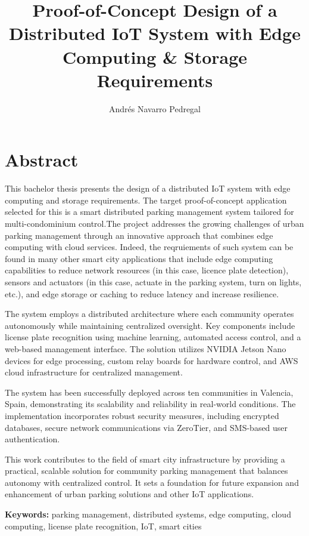 \documentclass[oneside, 12pt, a4paper]{book}
\title{Proof-of-Concept Design of a Distributed IoT System with Edge Computing \& Storage Requirements}
\author{Andrés Navarro Pedregal}
\begin{document}

\frontmatter
\maketitle

\blankpage%
\chapter*{Abstract}

This bachelor thesis presents the design of a distributed IoT system with edge computing and storage requirements. The target proof-of-concept application selected for this is a smart distributed parking management system tailored for multi-condominium control.The project addresses the growing challenges of urban parking management through an innovative approach that combines edge computing with cloud services. Indeed, the reqruiements of such system can be found in many other smart city applications that include edge computing capabilities to reduce network resources (in this case, licence plate detection), sensors and actuators (in this case, actuate in the parking system, turn on lights, etc.), and edge storage or caching to reduce latency and increase resilience.

The system employs a distributed architecture where each community operates autonomously while maintaining centralized oversight. Key components include license plate recognition using machine learning, automated access control, and a web-based management interface. The solution utilizes NVIDIA Jetson Nano devices for edge processing, custom relay boards for hardware control, and AWS cloud infrastructure for centralized management.

The system has been successfully deployed across ten communities in Valencia, Spain, demonstrating its scalability and reliability in real-world conditions. The implementation incorporates robust security measures, including encrypted databases, secure network communications via ZeroTier, and SMS-based user authentication.

This work contributes to the field of smart city infrastructure by providing a practical, scalable solution for community parking management that balances autonomy with centralized control. It sets a foundation for future expansion and enhancement of urban parking solutions and other IoT applications.

\textbf{Keywords:} parking management, distributed systems, edge computing, cloud computing, license plate recognition, IoT, smart cities
\end{document}
